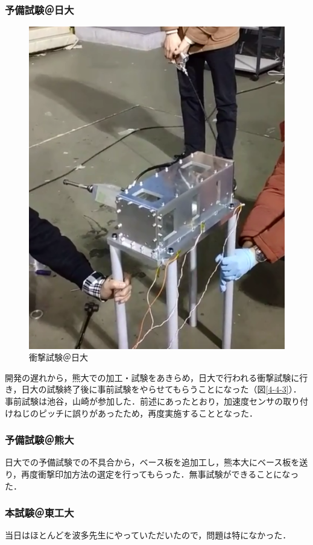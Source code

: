\subsubsection{予備試験＠日大}
\begin{figure}[H]
	\centering
	\includegraphics[scale=0.5]{04/fig/report_test_impact@nihon_univ.png}
	\caption{衝撃試験＠日大}
	\label{fig4-4-3}
\end{figure}
開発の遅れから，熊大での加工・試験をあきらめ，日大で行われる衝撃試験に行き，日大の試験終了後に事前試験をやらせてもらうことになった（図\ref{4-4-3}）．事前試験は池谷，山崎が参加した．前述にあったとおり，加速度センサの取り付けねじのピッチに誤りがあったため，再度実施することとなった．
\subsubsection{予備試験＠熊大}
日大での予備試験での不具合から，ベース板を追加工し，熊本大にベース板を送り，再度衝撃印加方法の選定を行ってもらった．無事試験ができることになった．
\subsubsection{本試験＠東工大}
当日はほとんどを波多先生にやっていただいたので，問題は特になかった．
